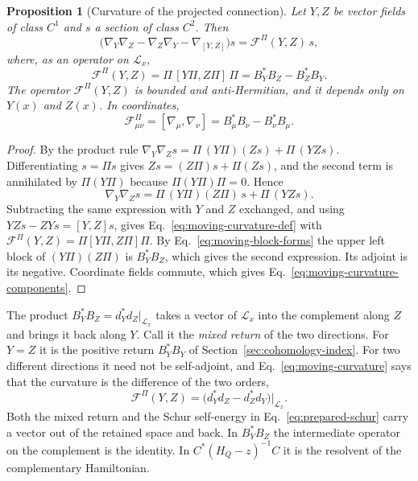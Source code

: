 \documentclass[11pt]{article}
\newtheorem{proposition}{Proposition}[section]
\theoremstyle{definition}
\begin{document}
\begin{proposition}[Curvature of the projected connection]
\label{prop:moving-curvature}
Let $Y,Z$ be vector fields of class $C^1$ and $s$ a section of class $C^2$. Then
\begin{equation}
 \bigl(\nabla_Y\nabla_Z-\nabla_Z\nabla_Y-\nabla_{[Y,Z]}\bigr)s=\mathcal F^\Pi(Y,Z)\,s ,
 \label{eq:moving-curvature-def}
\end{equation}
where, as an operator on $\mathcal L_x$,
\begin{equation}
 \mathcal F^\Pi(Y,Z)=\Pi\,[Y\Pi,Z\Pi]\,\Pi=B_Y^*B_Z-B_Z^*B_Y .
 \label{eq:moving-curvature}
\end{equation}
The operator $\mathcal F^\Pi(Y,Z)$ is bounded and anti-Hermitian, and it depends only on $Y(x)$ and $Z(x)$. In coordinates,
\begin{equation}
 \mathcal F^\Pi_{\mu\nu}=[\nabla_\mu,\nabla_\nu]=B_\mu^*B_\nu-B_\nu^*B_\mu .
 \label{eq:moving-curvature-components}
\end{equation}
\end{proposition}
\begin{proof}
By the product rule $\nabla_Y\nabla_Zs=\Pi\,(Y\Pi)(Zs)+\Pi\,(YZs)$. Differentiating $s=\Pi s$ gives $Zs=(Z\Pi)s+\Pi(Zs)$, and the second term is annihilated by $\Pi(Y\Pi)$ because $\Pi(Y\Pi)\Pi=0$. Hence
\[
 \nabla_Y\nabla_Zs=\Pi\,(Y\Pi)(Z\Pi)\,s+\Pi\,(YZs).
\]
Subtracting the same expression with $Y$ and $Z$ exchanged, and using $YZs-ZYs=[Y,Z]s$, gives Eq.~\eqref{eq:moving-curvature-def} with $\mathcal F^\Pi(Y,Z)=\Pi[Y\Pi,Z\Pi]\Pi$. By Eq.~\eqref{eq:moving-block-forms} the upper left block of $(Y\Pi)(Z\Pi)$ is $B_Y^*B_Z$, which gives the second expression. Its adjoint is its negative. Coordinate fields commute, which gives Eq.~\eqref{eq:moving-curvature-components}.
\end{proof}

The product $B_Y^*B_Z=d_Y^*d_Z|_{\mathcal L_x}$ takes a vector of $\mathcal L_x$ into the complement along $Z$ and brings it back along $Y$. Call it the \emph{mixed return} of the two directions. For $Y=Z$ it is the positive return $B_Y^*B_Y$ of Section~\ref{sec:cohomology-index}. For two different directions it need not be self-adjoint, and Eq.~\eqref{eq:moving-curvature} says that the curvature is the difference of the two orders,
\begin{equation}
 \mathcal F^\Pi(Y,Z)=\bigl(d_Y^*d_Z-d_Z^*d_Y\bigr)\big|_{\mathcal L_x}.
 \label{eq:moving-mixed-return}
\end{equation}
Both the mixed return and the Schur self-energy in Eq.~\eqref{eq:prepared-schur} carry a vector out of the retained space and back. In $B_Y^*B_Z$ the intermediate operator on the complement is the identity. In $C^*(H_Q-z)^{-1}C$ it is the resolvent of the complementary Hamiltonian.
\end{document}
